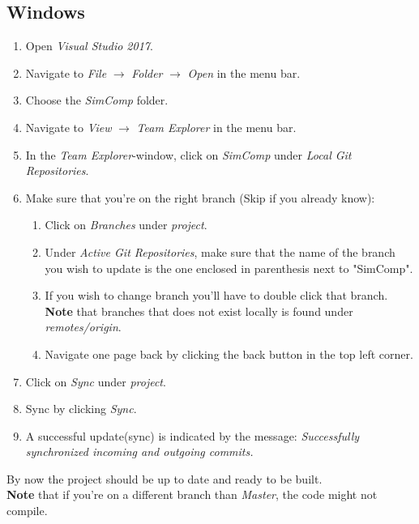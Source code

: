 \subsection{Windows}
\begin{enumerate}
    \item Open \textit{Visual Studio 2017}.
    \item Navigate to \textit{File} \(\rightarrow\) \textit{Folder} \(\rightarrow\) \textit{Open} in the menu bar.
    \item Choose the \textit{SimComp} folder.
    \item Navigate to \textit{View} \(\rightarrow\) \textit{Team Explorer} in the menu bar.
    \item In the \textit{Team Explorer}-window, click on \textit{SimComp} under \textit{Local Git Repositories}.
    \item Make sure that you're on the right branch (Skip if you already know):
        \begin{enumerate}
            \item Click on \textit{Branches} under \textit{project}.
            \item Under \textit{Active Git Repositories}, make sure that the name of the branch you wish to update is the one enclosed in parenthesis next to "SimComp".
            \item If you wish to change branch you'll have to double click that branch. \textbf{Note} that branches that does not exist locally is found under \textit{remotes/origin}.
            \item Navigate one page back by clicking the back button in the top left corner. 
        \end{enumerate}
    \item Click on \textit{Sync} under \textit{project}.
    \item Sync by clicking \textit{Sync}.
    \item A successful update(sync) is indicated by the message: \textit{Successfully synchronized incoming and outgoing commits.}
\end{enumerate}

By now the project should be up to date and ready to be built.\\
\textbf{Note} that if you're on a different branch than \textit{Master}, the code might not compile.